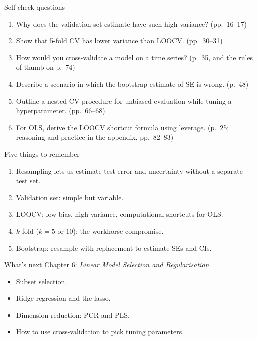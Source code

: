 \documentclass[aspectratio=169,11pt]{beamer}
\begin{document}
\begin{frame}{Self-check questions}
  \begin{enumerate}
    \item Why does the validation-set estimate have such high variance?
          (pp.~16--17)
    \item Show that 5-fold CV has lower variance than LOOCV.
          (pp.~30--31)
    \item How would you cross-validate a model on a time series?
          (p.~35, and the rules of thumb on p.~74)
    \item Describe a scenario in which the bootstrap estimate of SE is
          wrong. (p.~48)
    \item Outline a nested-CV procedure for unbiased evaluation while
          tuning a hyperparameter. (pp.~66--68)
    \item For OLS, derive the LOOCV shortcut formula using leverage.
          (p.~25; reasoning and practice in the appendix, pp.~82--83)
  \end{enumerate}
\end{frame}

\begin{frame}{Five things to remember}
  \begin{enumerate}
    \item Resampling lets us estimate test error and uncertainty
          without a separate test set.
    \item Validation set: simple but variable.
    \item LOOCV: low bias, high variance, computational shortcuts for
          OLS.
    \item $k$-fold ($k = 5$ or $10$): the workhorse compromise.
    \item Bootstrap: resample with replacement to estimate SEs and
          CIs.
  \end{enumerate}
\end{frame}

\begin{frame}{What's next}
  Chapter 6: \emph{Linear Model Selection and Regularisation}.
  \begin{itemize}
    \item Subset selection.
    \item Ridge regression and the lasso.
    \item Dimension reduction: PCR and PLS.
    \item How to use cross-validation to pick tuning parameters.
  \end{itemize}
\end{frame}
\end{document}
